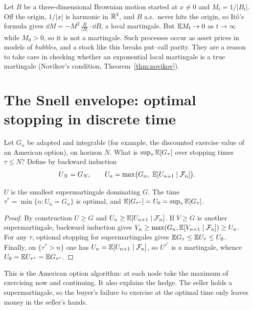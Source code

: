 \begin{example}\label{ex:strict}
Let $B$ be a three-dimensional Brownian motion started at $x\ne0$ and $M_t=1/|B_t|$. Off the origin, $1/|x|$ is harmonic in $\mathbb{R}^3$, and $B$ a.s.\ never hits the origin, so It\^o's formula gives $\dd M=-M^2\,\tfrac{B}{|B|}\cdot\dd B$, a local martingale. But $\mathbb{E} M_t\to0$ as $t\to\infty$ while $M_0>0$, so it is not a martingale. Such processes occur as asset prices in models of \emph{bubbles}, and a stock like this breaks put--call parity. They are a reason to take care in checking whether an exponential local martingale is a true martingale (Novikov's condition, Theorem~\ref{thm:novikov}).
\end{example}

\section{The Snell envelope: optimal stopping in discrete time}\label{sec:snell}

Let $G_n$ be adapted and integrable (for example, the discounted exercise value of an American option), on horizon $N$. What is $\sup_\tau\mathbb{E}[G_\tau]$ over stopping times $\tau\le N$? Define by backward induction
\[
U_N=G_N,\qquad U_n=\max\bigl(G_n,\ \mathbb{E}[U_{n+1}\mid\mathcal{F}_n]\bigr).
\]

\begin{theorem}\label{thm:snell}
$U$ is the smallest supermartingale dominating $G$. The time $\tau^*=\min\{n:U_n=G_n\}$ is optimal, and $\mathbb{E}[G_{\tau^*}]=U_0=\sup_\tau\mathbb{E}[G_\tau]$.
\end{theorem}
\begin{proof}
By construction $U\ge G$ and $U_n\ge\mathbb{E}[U_{n+1}\mid\mathcal{F}_n]$. If $V\ge G$ is another supermartingale, backward induction gives $V_n\ge\max(G_n,\mathbb{E}[V_{n+1}\mid\mathcal{F}_n])\ge U_n$. For any $\tau$, optional stopping for supermartingales gives $\mathbb{E} G_\tau\le\mathbb{E} U_\tau\le U_0$. Finally, on $\{\tau^*>n\}$ one has $U_n=\mathbb{E}[U_{n+1}\mid\mathcal{F}_n]$, so $U^{\tau^*}$ is a martingale, whence $U_0=\mathbb{E} U_{\tau^*}=\mathbb{E} G_{\tau^*}$.
\end{proof}

\begin{intuition}
This is the American option algorithm: at each node take the maximum of exercising now and continuing. It also explains the hedge. The seller holds a supermartingale, so the buyer's failure to exercise at the optimal time only leaves money in the seller's hands.
\end{intuition}

